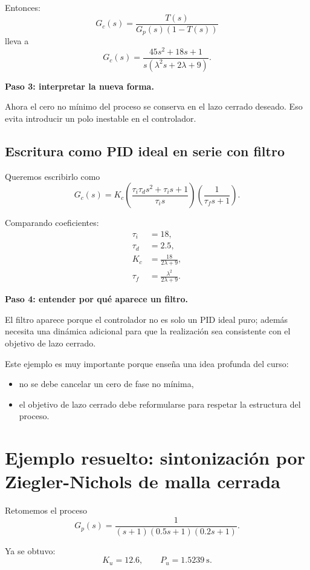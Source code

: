 \documentclass[11pt]{article}
\begin{document}
Entonces:
\[
G_c(s)=\frac{T(s)}{G_p(s)(1-T(s))}
\]
lleva a
\begin{equation}
G_c(s)=\frac{45s^2+18s+1}{s(\lambda^2 s+2\lambda+9)}.
\end{equation}

\textbf{Paso 3: interpretar la nueva forma.}

Ahora el cero no m\'inimo del proceso se conserva en el lazo cerrado deseado. Eso evita introducir un polo inestable en el controlador.

\subsection{Escritura como PID ideal en serie con filtro}
Queremos escribirlo como
\begin{equation}
G_c(s)=K_c\left(\frac{\tau_i\tau_d s^2+\tau_i s+1}{\tau_i s}\right)\left(\frac{1}{\tau_f s+1}\right).
\end{equation}

Comparando coeficientes:
\begin{align}
\tau_i &= 18,\\
\tau_d &= 2.5,\\
K_c &= \frac{18}{2\lambda+9},\\
\tau_f &= \frac{\lambda^2}{2\lambda+9}.
\end{align}

\textbf{Paso 4: entender por qu\'e aparece un filtro.}

El filtro aparece porque el controlador no es solo un PID ideal puro; adem\'as necesita una din\'amica adicional para que la realizaci\'on sea consistente con el objetivo de lazo cerrado.

Este ejemplo es muy importante porque ense\~na una idea profunda del curso:
\begin{itemize}
\item no se debe cancelar un cero de fase no m\'inima,
\item el objetivo de lazo cerrado debe reformularse para respetar la estructura del proceso.
\end{itemize}

\section{Ejemplo resuelto: sintonizaci\'on por Ziegler-Nichols de malla cerrada}
Retomemos el proceso
\[
G_p(s)=\frac{1}{(s+1)(0.5s+1)(0.2s+1)}.
\]

Ya se obtuvo:
\[
K_u=12.6,\qquad P_u=1.5239~\text{s}.
\]
\end{document}
